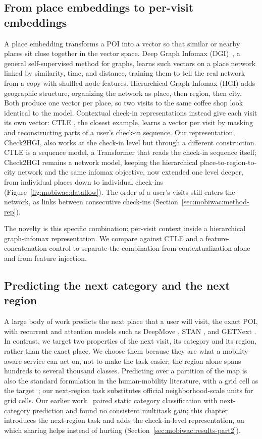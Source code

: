 \subsection{From place embeddings to per-visit embeddings}
\label{sec:mobiwac:related-embeddings}
A place embedding transforms a POI into a vector so that similar or nearby
places sit close together in the vector space.
Deep Graph Infomax (DGI)~\cite{velickovic2019deep}, a general self-supervised
method for graphs, learns such vectors on a place network linked by
similarity, time, and distance, training them to tell the real network from a
copy with shuffled node features.
Hierarchical Graph Infomax (HGI) \cite{huang2023hgi} adds geographic structure,
organizing the network as place, then region, then city. Both produce one vector per place, so two visits to the same coffee shop look
identical to the model.
Contextual check-in representations instead give each visit its own vector: CTLE
\cite{lin2021ctle}, the closest example, learns a vector per visit by masking and
reconstructing parts of a user's check-in sequence. Our
representation, Check2HGI, also works at the check-in level but through a
different construction. CTLE is a sequence model, a Transformer that reads the
check-in sequence itself; Check2HGI remains a network model, keeping the
hierarchical place-to-region-to-city network and the same infomax objective,
now extended one level deeper, from individual places down to individual
check-ins (Figure~\ref{fig:mobiwac:dataflow}). The order of a user's visits still enters
the network, as links between consecutive check-ins
(Section~\ref{sec:mobiwac:method-rep}).

The novelty is this specific combination: per-visit context inside a
hierarchical graph-infomax representation. We compare against CTLE and a feature-concatenation control to separate the
combination from contextualization alone and from feature injection.

\subsection{Predicting the next category and the next region}
\label{sec:mobiwac:related-tasks}
A large body of work predicts the next place that a user will visit, the exact POI,
with recurrent and attention models such as DeepMove \cite{feng2018deepmove}, STAN
\cite{luo2021stan}, and GETNext \cite{yang2022getnext}. In contrast, we target two properties of the next visit, its category and its
region, rather than the exact place. We choose them because they are
what a mobility-aware service can act on, not to make the task easier; the region
alone spans hundreds to several thousand classes. Predicting
over a partition of the map is also the standard formulation in the human-mobility
literature, with a grid cell as the target~\cite{luca2021mobilitysurvey}; our
next-region task substitutes official neighborhood-scale units for grid cells. Our earlier
work~\cite{silva2025mtlnet} paired static category classification with next-category prediction
and found no consistent multitask gain; this chapter introduces the next-region task and adds the check-in-level
representation, on which sharing helps instead of hurting (Section~\ref{sec:mobiwac:results-part2}).

